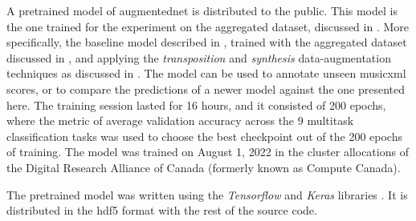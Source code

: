 
A pretrained model of \gls{augmentednet} is distributed to
the public. This model is the one trained for the experiment
on the aggregated dataset, discussed in
. More specifically,
the baseline model described in ,
trained with the aggregated dataset discussed in
, and applying the
\emph{transposition} and \emph{synthesis} data-augmentation
techniques as discussed in
. The model can be used
to annotate unseen \gls{musicxml} scores, or to compare the
predictions of a newer model against the one presented here.
The training session lasted for 16 hours, and it consisted
of 200 epochs, where the metric of average validation
accuracy across the 9 multitask classification tasks was
used to choose the best checkpoint out of the 200 epochs of
training. The model was trained on August 1, 2022 in the
cluster allocations of the Digital Research Alliance of
Canada (formerly known as Compute Canada).

The pretrained model was written using the \emph{Tensorflow}
and \emph{Keras} libraries \parencite{abadi2016tensorflow,
chollet2021deep}. It is distributed in the \gls{hdf5} format
with the rest of the source
code. 
